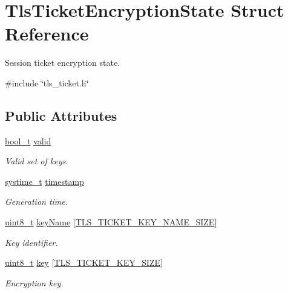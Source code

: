 \hypertarget{structTlsTicketEncryptionState}{}\section{Tls\+Ticket\+Encryption\+State Struct Reference}
\label{structTlsTicketEncryptionState}


Session ticket encryption state.  




{\ttfamily \#include \char`\"{}tls\+\_\+ticket.\+h\char`\"{}}

\subsection*{Public Attributes}
\begin{DoxyCompactItemize}
\item 
\hyperlink{compiler__port_8h_a812d16e5494522586b3784e55d479912}{bool\+\_\+t} \hyperlink{structTlsTicketEncryptionState_ac32d4eacdd76de6fc7e4ba33deb03928}{valid}
\begin{DoxyCompactList}\small\item\em Valid set of keys. \end{DoxyCompactList}\item 
\hyperlink{compiler__port_8h_ae3e32a98d431a02106616da3071832dd}{systime\+\_\+t} \hyperlink{structTlsTicketEncryptionState_acd1f7694dc380aa6ff954dce48bfa9ce}{timestamp}
\begin{DoxyCompactList}\small\item\em Generation time. \end{DoxyCompactList}\item 
\hyperlink{stdint_8h_aba7bc1797add20fe3efdf37ced1182c5}{uint8\+\_\+t} \hyperlink{structTlsTicketEncryptionState_a0a87a9954a33281e7891644f24924770}{key\+Name} \mbox{[}\hyperlink{tls__ticket_8h_a5452f40f64a879b44a635abb2ab07628}{T\+L\+S\+\_\+\+T\+I\+C\+K\+E\+T\+\_\+\+K\+E\+Y\+\_\+\+N\+A\+M\+E\+\_\+\+S\+I\+ZE}\mbox{]}
\begin{DoxyCompactList}\small\item\em Key identifier. \end{DoxyCompactList}\item 
\hyperlink{stdint_8h_aba7bc1797add20fe3efdf37ced1182c5}{uint8\+\_\+t} \hyperlink{structTlsTicketEncryptionState_a9305708f5ec5626fde0314ba7627d036}{key} \mbox{[}\hyperlink{tls__ticket_8h_a635960598196f4551883147633540063}{T\+L\+S\+\_\+\+T\+I\+C\+K\+E\+T\+\_\+\+K\+E\+Y\+\_\+\+S\+I\+ZE}\mbox{]}
\begin{DoxyCompactList}\small\item\em Encryption key. \end{DoxyCompactList}\end{DoxyCompactItemize}



